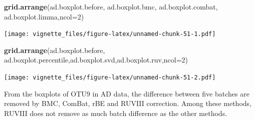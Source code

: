 \documentclass[]{book}
\newenvironment{Shaded}{\begin{snugshade}}{\end{snugshade}}
\newcommand{\KeywordTok}[1]{\textcolor[rgb]{0.13,0.29,0.53}{\textbf{#1}}}
\newcommand{\DataTypeTok}[1]{\textcolor[rgb]{0.13,0.29,0.53}{#1}}
\newcommand{\DecValTok}[1]{\textcolor[rgb]{0.00,0.00,0.81}{#1}}
\newcommand{\StringTok}[1]{\textcolor[rgb]{0.31,0.60,0.02}{#1}}
\newcommand{\OperatorTok}[1]{\textcolor[rgb]{0.81,0.36,0.00}{\textbf{#1}}}
\newcommand{\NormalTok}[1]{#1}
\begin{document}
\begin{Shaded}
\end{Shaded}

\begin{Shaded}
\begin{Highlighting}[]
\KeywordTok{grid.arrange}\NormalTok{(ad.boxplot.before, ad.boxplot.bmc, ad.boxplot.combat, ad.boxplot.limma,}\DataTypeTok{ncol=}\DecValTok{2}\NormalTok{)}
\end{Highlighting}
\end{Shaded}

\texttt{[image: vignette\_files/figure-latex/unnamed-chunk-51-1.pdf]}

\begin{Shaded}
\begin{Highlighting}[]
\KeywordTok{grid.arrange}\NormalTok{(ad.boxplot.before, ad.boxplot.percentile,ad.boxplot.svd,ad.boxplot.ruv,}\DataTypeTok{ncol=}\DecValTok{2}\NormalTok{)}
\end{Highlighting}
\end{Shaded}

\texttt{[image: vignette\_files/figure-latex/unnamed-chunk-51-2.pdf]}

From the boxplots of OTU9 in AD data, the difference between five
batches are removed by BMC, ComBat, rBE and RUVIII correction. Among
these methods, RUVIII does not remove as much batch difference as the
other methods.
\end{document}
